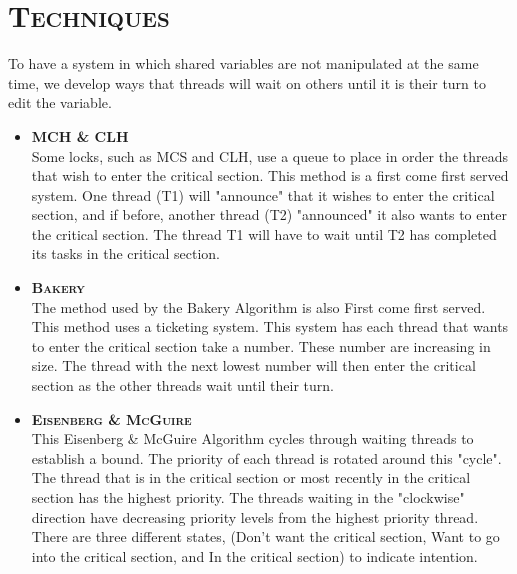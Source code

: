 \documentclass[FinalReport.tex]{subfiles}
\begin{document}
\bigskip

\section*{\textsc{\Large Techniques}}

	To have a system in which shared variables are not manipulated at the same time, we develop ways that threads will wait on others until it is their turn to edit the variable.  
	
	\begin{itemize}
		\item \textsc{ \bf MCH \& CLH} \\
			Some locks, such as MCS and CLH, use a queue to place in order the threads that wish to enter the critical section.  This method is a first come first served system.  One thread (T1) will "announce" that it wishes to enter the critical section, and if before, another thread (T2) "announced" it also wants to enter the critical section.  The thread T1 will have to wait until T2 has completed its tasks in the critical section.
			
		\item \textsc{ \bf Bakery}\\
		The method used by the Bakery Algorithm is also First come first served.  This method uses a ticketing system.  This system has each thread that wants to enter the critical section take a number.  These number are increasing in size.  The thread with the next lowest number will then enter the critical section as the other threads wait until their turn.

		\item \textsc{ \bf Eisenberg \& McGuire}\\
		This Eisenberg \& McGuire Algorithm cycles through waiting threads to establish a bound.  The priority of each thread is rotated around this "cycle".  The thread that is in the critical section or most recently in the critical section has the highest priority.  The threads waiting in the "clockwise" direction have decreasing priority levels from the highest priority thread.  There are three different states, (Don't want the critical section, Want to go into the critical section, and In the critical section) to indicate intention. 
		

\end{itemize}
\end{document}
